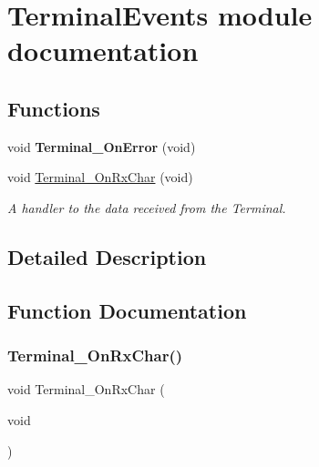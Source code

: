 \hypertarget{group___terminal_events__module}{}\section{Terminal\+Events module documentation}
\label{group___terminal_events__module}
\subsection*{Functions}
\begin{DoxyCompactItemize}
\item 
\mbox{\label{group___terminal_events__module_gab3fdda4cf4f6f2d49342b89901e72126}} 
void {\bfseries Terminal\+\_\+\+On\+Error} (void)
\item 
void \hyperlink{group___terminal_events__module_gae4f74046c672070dcba1f4fed4537435}{Terminal\+\_\+\+On\+Rx\+Char} (void)
\begin{DoxyCompactList}\small\item\em A handler to the data received from the Terminal. \end{DoxyCompactList}\end{DoxyCompactItemize}


\subsection{Detailed Description}


\subsection{Function Documentation}
\mbox{\label{group___terminal_events__module_gae4f74046c672070dcba1f4fed4537435}} 
\subsubsection{\texorpdfstring{Terminal\+\_\+\+On\+Rx\+Char()}{Terminal\_OnRxChar()}}
{\footnotesize\ttfamily void Terminal\+\_\+\+On\+Rx\+Char (\begin{DoxyParamCaption}\item[{void}]{ }\end{DoxyParamCaption})}



